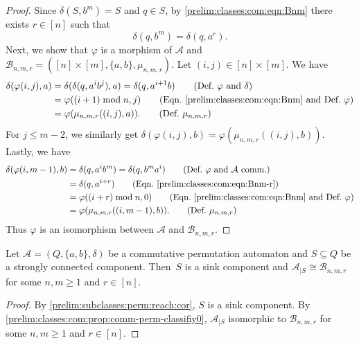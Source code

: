 \begin{proof}
	Since $\delta(S, b^m) = S$ and $q \in S$, 
	by \cref{prelim:classes:com:eqn:Bnm} there exists $r \in [n]$ such that
	\begin{equation} \label{prelim:classes:com:eqn:Bnm-r}
	\delta(q, b^m) = \delta(q, a^r).
	\end{equation}
	Next, we show that $\varphi$ is a morphism
	of $\mathcal A$ and $\mathcal B_{n,m,r} = ([n] \times [m], \{a,b\}, \mu_{n,m,r})$.	
	Let $(i,j) \in [n] \times [m]$.
	We have 
	\begin{align*}
	\delta(\varphi(i,j), a)
	& = \delta(\delta(q, a^i b^j), a)  
	  = \delta(q, a^{i+1}b) \tag{Def.~$\varphi$ and $\delta$} \\
	& = \varphi((i+1)\bmod n, j) \tag{Eqn.~\eqref{prelim:classes:com:eqn:Bnm} and Def.~$\varphi$} \\ 
	& = \varphi(\mu_{n,m,r}((i,j), a)). \tag{Def.~$\mu_{n,m,r}$}
	\end{align*}
	For $j \le m - 2$, we similarly get $\delta(\varphi(i,j), b) = \varphi(\mu_{n,m,r}((i,j), b))$.
	Lastly, we have
	\begin{align*}
	\delta(\varphi(i,m-1), b) 
    & = \delta(q, a^i b^m) = \delta(q, b^m a^i) \tag{Def.~$\varphi$ and $\mathcal A$ comm.} \\ 
	& = \delta(q, a^{i + r}) \tag{Eqn.~\eqref{prelim:classes:com:eqn:Bnm-r}} \\
	& = \varphi((i+r) \bmod{n}, 0)  \tag{Eqn.~\eqref{prelim:classes:com:eqn:Bnm} and Def.~$\varphi$} \\
	& = \varphi(\mu_{n,m,r}((i,m-1), b)). \tag{Def.~$\mu_{n,m,r}$}	
	\end{align*}
	Thus $\varphi$ is an isomorphism between $\mathcal A$ and $\mathcal B_{n,m,r}$.
\end{proof}

\begin{corollary}
	\label{prelim:classes:com:prop:comm-perm-classifiy}
	Let $\mathcal A = (Q, \{a,b\}, \delta)$ be a commutative permutation automaton
	and $S \subseteq Q$ be a strongly connected component.
	Then~$S$ is a sink component
	and $\mathcal A_{|S} \cong \mathcal B_{n,m,r}$
	for some $n,m \ge 1$ and $r \in [n]$.
\end{corollary}
\begin{proof}
	By \cref{prelim:subclasses:perm:reach:cor}, $S$ is a sink component.
	By \cref{prelim:classes:com:prop:comm-perm-classifiy0}, $\mathcal A_{|S}$
	isomorphic to $\mathcal B_{n,m,r}$ for some $n,m \ge 1$
	and $r \in [n]$.	
\end{proof}

